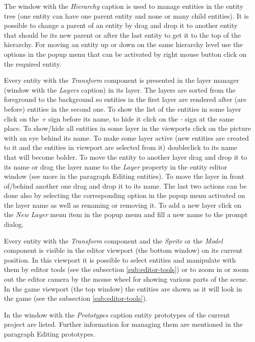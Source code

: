 The window with the \emph{Hierarchy} caption is used to manage entities in the entity tree (one entity can have one parent entity and none or many child entities). It is possible to change a parent of an entity by drag and drop it to another entity that should be its new parent or after the last entity to get it to the top of the hierarchy. For moving an entity up or down on the same hierarchy level use the options in the popup menu that can be activated by right mouse button click on the required entity.

Every entity with the \emph{Transform} component is presented in the layer manager (window with the \emph{Layers} caption) in its layer. The layers are sorted from the foreground to the background so entities in the first layer are rendered after (are before) entities in the second one. To show the list of the entities in some layer click on the \emph{+} sign before its name, to hide it click on the \emph{-} sign at the same place. To show/hide all entities in some layer in the viewports click on the picture with an eye behind its name. To make some layer active (new entities are created to it and the entities in viewport are selected from it) doubleclick to its name that will become bolder. To move the entity to another layer drag and drop it to its name or drag the layer name to the \emph{Layer} property in the entity editor window (see more in the paragraph Editing entities). To move the layer in front of/behind another one drag and drop it to its name. The last two actions can be done also by selecting the corresponding option in the popup menu activated on the layer name as well as renaming or removing it. To add a new layer click on the \emph{New Layer} menu item in the popup menu and fill a new name to the prompt dialog.

Every entity with the \emph{Transform} component and the \emph{Sprite} or the \emph{Model} component is visible in the editor viewport (the bottom window) on its current position. In this viewport it is possible to select entities and manipulate with them by editor tools (see the subsection \ref{sub:editor-tools}) or to zoom in or zoom out the editor camera by the mouse wheel for showing various parts of the scene. In the game viewport (the top window) the entities are shown as it will look in the game (see the subsection \ref{sub:editor-tools}).

In the window with the \emph{Prototypes} caption entity prototypes of the current project are listed. Further information for managing them are mentioned in the paragraph Editing prototypes.

